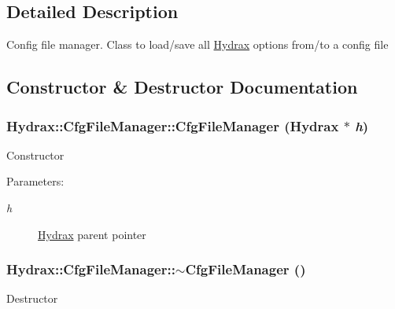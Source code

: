 \subsection{Detailed Description}
Config file manager. Class to load/save all \hyperlink{class_hydrax_1_1_hydrax}{Hydrax} options from/to a config file 

\subsection{Constructor \& Destructor Documentation}
\hypertarget{class_hydrax_1_1_cfg_file_manager_c1d1c99b2a8f2fd4c5c58bf329755468}{
\subsubsection[{CfgFileManager}]{\setlength{\rightskip}{0pt plus 5cm}Hydrax::CfgFileManager::CfgFileManager ({\bf Hydrax} $\ast$ {\em h})}}
\label{class_hydrax_1_1_cfg_file_manager_c1d1c99b2a8f2fd4c5c58bf329755468}


Constructor \begin{Desc}
\item[Parameters:]
\begin{description}
\item[{\em h}]\hyperlink{class_hydrax_1_1_hydrax}{Hydrax} parent pointer \end{description}
\end{Desc}
\hypertarget{class_hydrax_1_1_cfg_file_manager_e5567d446a52bf06a2e4e421066251d3}{
\subsubsection[{$\sim$CfgFileManager}]{\setlength{\rightskip}{0pt plus 5cm}Hydrax::CfgFileManager::$\sim$CfgFileManager ()}}
\label{class_hydrax_1_1_cfg_file_manager_e5567d446a52bf06a2e4e421066251d3}


Destructor 

